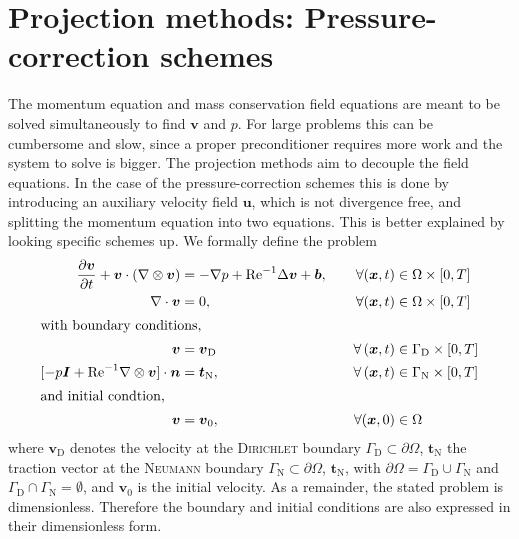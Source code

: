 \documentclass[]{scrartcl}
\newcommand{\pfrac}[2]{\frac{\partial #1}{\partial #2}}
\newcommand{\bs}[1]{\boldsymbol{#1}}
\begin{document}
\section{Projection methods: Pressure-correction schemes}
The momentum equation and mass conservation field equations are meant to be solved simultaneously to find $\bs{v}$ and $p$. For large problems this can be cumbersome and slow, since a proper preconditioner requires more work and the system to solve is bigger. The projection methods aim to decouple the field equations. In the case of the pressure-correction schemes this is done by introducing an auxiliary velocity field $\bs{u}$, which is not divergence free, and splitting the momentum equation into two equations. This is better explained by looking specific schemes up. We formally define the problem
\begin{alignat*}{2}
	\pfrac{\bs{v}}{t}  + \bs{v}\cdot (\nabla \otimes \bs{v}) &=  -\nabla p  +  \mathrm{Re}^{-1} \Delta \bs{v} + \bs{b}, \quad &\forall (\bs{x}, t) &\in \Omega \times \left[0, T \right] \\
	\nabla \cdot \bs{v} &= 0, &\forall (\bs{x}, t) &\in \Omega \times \left[0, T \right] \\
	\intertext{with boundary conditions,}
	\bs{v} &= \bs{v}_\textrm{D} &\forall\left(\bs{x}, t\right) &\in \Gamma_\textrm{D} \times \left[0, T \right] \\ 
	[-p \bs{I} + \textrm{Re}^{-1}\nabla \otimes \bs{v}]\cdot \bs{n} &= \bs{t}_\textrm{N}, &\forall \left(\bs{x}, t\right) &\in \Gamma_\textrm{N} \times \left[0, T \right] \\
	\intertext{and initial condtion,} 
	\bs{v} &= \bs{v}_0, &\forall (\bs{x}, 0) &\in \Omega
\end{alignat*}
where $\bs{v}_\textrm{D}$ denotes the velocity at the \textsc{Dirichlet} boundary $\Gamma_\textrm{D}\subset\partial\Omega$, $\bs{t}_\textrm{N}$ the traction vector at the \textsc{Neumann} boundary $\Gamma_\textrm{N}\subset\partial\Omega$, $\bs{t}_\textrm{N}$, with $\partial \Omega = \Gamma_\textrm{D} \cup \Gamma_\textrm{N}$ and $ \Gamma_\textrm{D} \cap \Gamma_\textrm{N} = \emptyset$, and $\bs{v}_0$ is the initial velocity. As a remainder, the stated problem is dimensionless. Therefore the boundary and initial conditions are also expressed in their dimensionless form.
\end{document}

